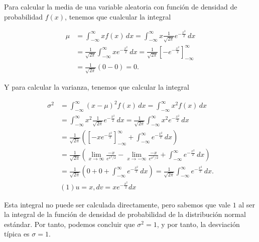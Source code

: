 \documentclass[
  a4paper,
]{scrreport}
\theoremstyle{definition}
\theoremstyle{remark}
\begin{document}
\begin{tcolorbox}[enhanced jigsaw, opacityback=0, bottomtitle=1mm, coltitle=black, opacitybacktitle=0.6, colback=white, breakable, left=2mm, titlerule=0mm, bottomrule=.15mm, colbacktitle=quarto-callout-tip-color!10!white, toprule=.15mm, leftrule=.75mm, arc=.35mm, toptitle=1mm, colframe=quarto-callout-tip-color-frame, title=\textcolor{quarto-callout-tip-color}{\faLightbulb}\hspace{0.5em}{Solución}, rightrule=.15mm]

Para calcular la media de una variable aleatoria con función de densidad
de probabilidad \(f(x)\), tenemos que cualcular la integral

\begin{align*}
\mu 
&= \int_{-\infty}^\infty x f(x)\,dx
= \int_{-\infty}^\infty x \frac{1}{\sqrt{2\pi}} e^{-\frac{x^2}{2}}\,dx\\
&= \frac{1}{\sqrt{2\pi}} \int_{-\infty}^\infty x e^{-\frac{x^2}{2}}\,dx
= \frac{1}{\sqrt{2\pi}} \left[ -e^{-\frac{x^2}{2}} \right]_{-\infty}^\infty \tag{Cambio $u=-x^2/2$}\\
&= \frac{1}{\sqrt{2\pi}} \left( 0 - 0 \right)
= 0.
\end{align*}

Y para calcular la varianza, tenemos que calcular la integral

\begin{align*}
\sigma^2
&= \int_{-\infty}^\infty (x - \mu)^2 f(x)\,dx
= \int_{-\infty}^\infty x^2 f(x)\,dx \tag{Como $\mu = 0$}\\
&= \int_{-\infty}^\infty x^2 \frac{1}{\sqrt{2\pi}} e^{-\frac{x^2}{2}}\,dx
= \frac{1}{\sqrt{2\pi}} \int_{-\infty}^\infty x^2 e^{-\frac{x^2}{2}}\,dx \\
&= \frac{1}{\sqrt{2\pi}} \left(\left[ -x e^{-\frac{x^2}{2}} \right]_{-\infty}^\infty + \int_{-\infty}^\infty e^{-\frac{x^2}{2}}\,dx\right) \tag{Integración por partes (1)}\\
&= \frac{1}{\sqrt{2\pi}} \left( \lim_{x\to\infty} \frac{-x}{e^{x^2/2}} - \lim_{x\to-\infty} \frac{-x}{e^{x^2/2}} + \int_{-\infty}^\infty e^{-\frac{x^2}{2}}\,dx \right) \\
&= \frac{1}{\sqrt{2\pi}} \left( 0 + 0 + \int_{-\infty}^\infty e^{-\frac{x^2}{2}}\,dx \right)
= \frac{1}{\sqrt{2\pi}} \int_{-\infty}^\infty e^{-\frac{x^2}{2}}\,dx.\\
&(1) u = x, dv = xe^{-\frac{x^2}{2}}dx
\end{align*}

Esta integral no puede ser calculada directamente, pero sabemos que vale
\(1\) al ser la integral de la función de densidad de probabilidad de la
distribución normal estándar. Por tanto, podemos concluir que
\(\sigma^2 = 1\), y por tanto, la desviación típica es \(\sigma = 1\).

\end{tcolorbox}
\end{document}

